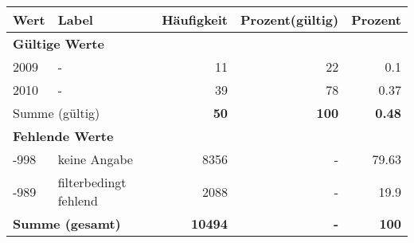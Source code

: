     \begin{longtable}{lXrrr}
     \toprule
     \textbf{Wert} & \textbf{Label} & \textbf{Häufigkeit} & \textbf{Prozent(gültig)} & \textbf{Prozent} \\
     \endhead
     \midrule
     \multicolumn{5}{l}{\textbf{Gültige Werte}}\\

     2009 &
     \multicolumn{1}{X}{ -  } &


       \num{11} &
       \num[round-mode=places,round-precision=2]{22} &
         \num[round-mode=places,round-precision=2]{0.1} \\

     2010 &
     \multicolumn{1}{X}{ -  } &


       \num{39} &
       \num[round-mode=places,round-precision=2]{78} &
         \num[round-mode=places,round-precision=2]{0.37} \\
     \midrule
     \multicolumn{2}{l}{Summe (gültig)} &
       \textbf{\num{50}} &
     \textbf{\num{100}} &
       \textbf{\num[round-mode=places,round-precision=2]{0.48}} \\
     \multicolumn{5}{l}{\textbf{Fehlende Werte}}\\
       -998 &
       keine Angabe &
         \num{8356} &
        - &
         \num[round-mode=places,round-precision=2]{79.63} \\
       -989 &
       filterbedingt fehlend &
         \num{2088} &
        - &
         \num[round-mode=places,round-precision=2]{19.9} \\
     \midrule
     \multicolumn{2}{l}{\textbf{Summe (gesamt)}} &
          \textbf{\num{10494}} &
        \textbf{-} &
        \textbf{\num{100}} \\
     \bottomrule
     \end{longtable}
     
